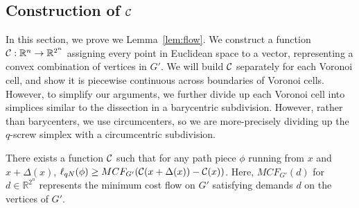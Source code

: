 \subsection{Construction of $\mathcal{C}$}

In this section, we prove we Lemma~\ref{lem:flow}. We construct a function
$\mathcal{C}:\mathbb{R}^n \rightarrow \mathbb{R}^{2^n}$ assigning every point in
Euclidean space to a vector, representing a convex combination of vertices
in $G'$. We will build $\mathcal{C}$ separately for each Voronoi cell, and show
it is piecewise continuous across boundaries of Voronoi cells. 
However, to simplify our arguments, we further divide up each Voronoi cell
into simplices similar to the dissection in a barycentric subdivision.
However, rather than barycenters, we use circumcenters, so we are
more-precisely dividing up the $q$-screw simplex with a circumcentric
subdivision. 

\begin{lemma}\label{lem:flow} There exists a function $\mathcal{C}$ such that for
any
path piece $\phi$ running from $x$ and $x+\Delta(x)$, $\ell_{qN}(\phi) \geq
MCF_{G'}(\mathcal{C}(x+\Delta(x))-\mathcal{C}(x))$. Here, $MCF_{G'}(d)$ for $d \in
\mathbb{R}^{2^n}$ represents the minimum cost flow on $G'$ satisfying demands
$d$ on the vertices of $G'$.

\end{lemma}

